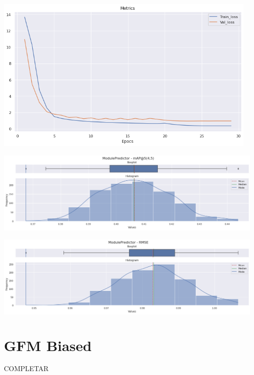 \documentclass[11pt,a4paper,twoside]{thesis}
\begin{document}
\begin{center}
	\includegraphics[width=13cm]{./images/metrics-GFM-train-val-loss.png}
\end{center}

\begin{center}
\includegraphics[width=15cm]{./images/metrics-GFM-mapk.png}
\end{center}

\begin{center}
	\includegraphics[width=15cm]{./images/metrics-GFM-RMSE.png}
\end{center}



\section{GFM Biased}

COMPLETAR
\end{document}
